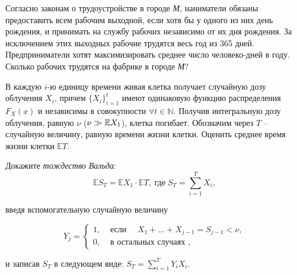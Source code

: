\begin{problem}
Согласно законам о трудоустройстве в городе \textit{М}, наниматели обязаны предоставить всем рабочим выходной, если хотя бы у одного из них день рождения, и принимать на службу рабочих независимо от их дня рождения. За исключением этих выходных рабочие трудятся весь год из 365 дней. Предприниматели хотят максимизировать среднее число человеко-дней в году. Сколько рабочих трудятся на фабрике в городе \textit{М}?

\end{problem}

\begin{problem}
В каждую $i$-ю единицу времени живая клетка получает случайную дозу облучения $X_i$, причем $\{ X_i\}_{i=1}^{t}$ имеют 
одинаковую функцию распределения $F_X(x)$ и независимы в совокупности $\forall t \in \mathbb{N}$. Получив интегральную дозу облучения, 
равную $\nu$ ($\nu \gg \mathrm{{\mathbb E}} X_1$), клетка погибает. Обозначим через $T$ -- случайную величину, равную времени жизни клетки.
Оценить среднее время жизни клетки ${\mathbb E}T$. 
\end{problem}

\begin{ordre}

Докажите \textit{тождество Вальда}: 
$$
{\mathbb E}S_T={\mathbb E}X_1\cdot {\mathbb E}T, \; \text{где} \; S_T = \sum_{i=1}^{T}X_i,    
$$

\noindent введя вспомогательную случайную величину

$$
Y_j=\begin{cases}
1, &\text{ если }\quad X_1+\ldots +X_{j-1}=S_{j-1}<\nu, \\
0, &\text{ в остальных случаях }, 
\end{cases}
$$
 
\noindent и записав $S_{T}$ в следующем виде: $S_T = \sum_{i=1}^T Y_i X_i$. 

\end{ordre}

